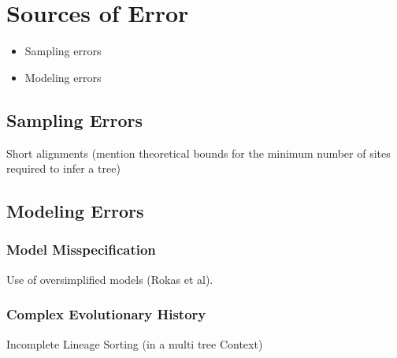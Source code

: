 \section{Sources of Error} \label{sec:error-sources}

\begin{itemize}
 \item Sampling errors
 \item Modeling errors
\end{itemize}

\subsection{Sampling Errors} \label{sec:sampling-error}

Short alignments (mention theoretical bounds for the minimum number of sites required to infer a tree)

\subsection{Modeling Errors} \label{sec:modeling-errors}

\subsubsection{Model Misspecification} \label{sec:misspecification}

Use of oversimplified models (Rokas et al). 

\subsubsection{Complex Evolutionary History} \label{sec:complex-history}

Incomplete Lineage Sorting (in a multi tree Context)